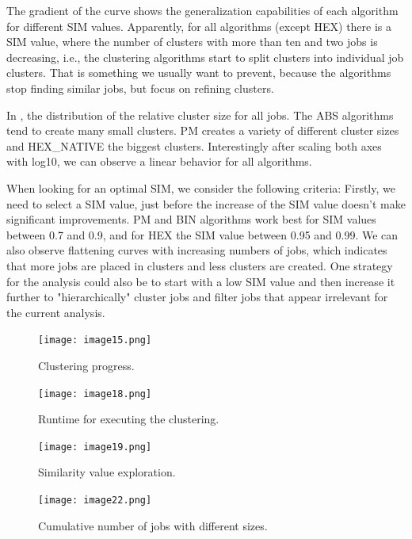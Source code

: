 \documentclass{jhps}
\begin{document}
The gradient of the curve shows the generalization capabilities of each algorithm for different SIM values.
Apparently, for all algorithms (except HEX) there is a SIM value, where the number of clusters with more than ten and two jobs is decreasing, i.e., the clustering algorithms start to split clusters into individual job clusters.
That is something we usually want to prevent, because the algorithms stop finding similar jobs, but focus on refining clusters.

\smallskip

In , the distribution of the relative cluster size for all jobs.
The ABS algorithms tend to create many small clusters.
PM creates a variety of different cluster sizes and HEX\_NATIVE the biggest clusters.
Interestingly after scaling both axes with log10, we can observe a linear behavior for all algorithms.

When looking for an optimal SIM, we consider the following criteria:
Firstly, we need to select a SIM value, just before the increase of the SIM value doesn't make significant improvements.
PM and BIN algorithms work best for SIM values between 0.7 and 0.9, and for HEX the SIM value between 0.95 and 0.99.
We can also observe flattening curves with increasing numbers of jobs, which indicates that more jobs are placed in clusters and less clusters are created.
One strategy for the analysis could also be to start with a low SIM value and then increase it further to "hierarchically" cluster jobs and filter jobs that appear irrelevant for the current analysis.

\begin{figure}
  \centering
   \texttt{[image: image15.png]}
   \caption{Clustering progress.}
   \label{fig:clustering_progress}
\end{figure}

\begin{figure}
  \centering
  \texttt{[image: image18.png]}
  \caption{Runtime for executing the clustering.}
  \label{fig:alg_runtimes}
\end{figure}


\begin{figure}
  \centering
  \texttt{[image: image19.png]}
  \caption{Similarity value exploration.}
  \label{fig:sim_exploration}
\end{figure}

\begin{figure}
  \centering
  \texttt{[image: image22.png]}
  \caption{Cumulative number of jobs with different sizes.}
  \label{fig:cum_num_job_sizes}
\end{figure}
\end{document}
